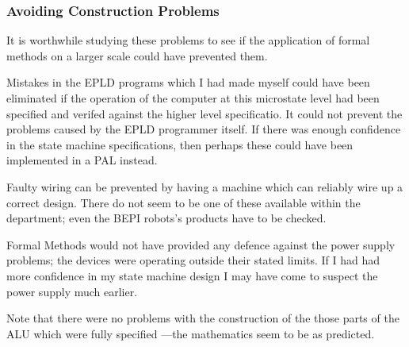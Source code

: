 \subsubsection{Avoiding Construction Problems}
It is worthwhile studying these problems to see if the application of formal methods on a larger scale could have prevented them.

Mistakes in the EPLD programs which I had made myself could have been eliminated if the operation of the computer at this microstate level had been specified and verifed against the higher level specificatio.
It could not prevent the problems caused by the EPLD programmer itself.
If there was enough confidence in the state machine specifications, then perhaps these could have been implemented in a PAL instead.

Faulty wiring can be prevented by having  a machine which can reliably wire up a correct design. There do not seem to be one of these available within the department;
even the BEPI robots's products have to be checked.

Formal Methods would  not have provided any defence against the power supply problems; the devices were operating outside their stated limits. 
If I had had more confidence in my state machine design I may have come to suspect the power supply much earlier.

Note that there were no problems  with the construction of the those parts of the ALU which were fully specified ---the mathematics seem to be as predicted.


